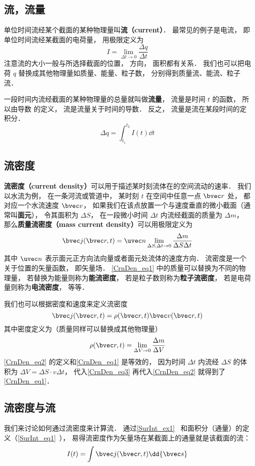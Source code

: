 

\subsection{流，流量}
单位时间流经某个截面的某种物理量叫\textbf{流（current）}． 最常见的例子是电流， 即单位时间流经某截面的电荷量， 用极限定义为
\begin{equation}
I = \lim_{\Delta t \to 0} \frac{\Delta q}{\Delta t}
\end{equation}
注意流的大小一般与所选择截面的位置， 方向， 面积都有关系． 我们也可以把电荷 $q$ 替换成其他物理量如质量、能量、粒子数， 分别得到质量流、能流、粒子流．

一段时间内流经截面的某种物理量的总量就叫做\textbf{流量}， 流量是时间 $t$ 的函数， 所以由导数 的定义， 流是流量关于时间的导数． 反之， 流量是流在某段时间的定积分．
\begin{equation}
\Delta q = \int_{t_1}^{t_2} I(t) \dd{t}
\end{equation}

\subsection{流密度}
\textbf{流密度（current density）}可以用于描述某时刻流体在的空间流动的速率． 我们以水流为例， 在一条河流或管道中， 某时刻 $t$ 在空间中任意一点 $\bvec r$ 处， 都对应一个水流速度 $\bvec v$， 如果我们在该点放置一个与速度垂直的微小截面（通常叫\textbf{面元}）， 令其面积为 $\Delta S$， 在一段微小时间 $\Delta t$ 内流经截面的质量为 $\Delta m$， 那么\textbf{质量流密度（mass current density）}可以用极限定义为
\begin{equation}\label{CrnDen_eq1}
\bvec j(\bvec r, t) = \uvec n \lim_{\Delta S, \Delta t \to 0} \frac{\Delta m}{\Delta S \Delta t}
\end{equation}
其中 $\uvec n$ 表示面元正方向法向量或者面元处流体的速度方向． 流密度是一个关于位置的矢量函数， 即矢量场． \autoref{CrnDen_eq1} 中的质量可以替换为不同的物理量， 若替换为能量则称为\textbf{能流密度}， 若是粒子数则称为\textbf{粒子流密度}， 若是电荷量则称为\textbf{电流密度}， 等等． 

我们也可以根据密度和速度来定义流密度
\begin{equation}\label{CrnDen_eq2}
\bvec j(\bvec r, t) = \rho(\bvec r, t) \bvec v(\bvec r, t)
\end{equation}
其中密度定义为（质量同样可以替换成其他物理量）
\begin{equation}\label{CrnDen_eq3}
\rho(\bvec r, t) = \lim_{\Delta V\to 0} \frac{\Delta m}{\Delta V}
\end{equation}
\autoref{CrnDen_eq2} 的定义和\autoref{CrnDen_eq1} 是等效的， 因为时间 $\Delta t$ 内流经 $\Delta S$ 的体积为 $\Delta V = \Delta S \cdot v  \Delta t$， 代入\autoref{CrnDen_eq3} 再代入\autoref{CrnDen_eq2} 就得到了\autoref{CrnDen_eq1}．

\subsection{流密度与流}
我们来讨论如何通过流密度来计算流． 通过\autoref{SurInt_ex1}~ 和面积分（通量）的定义（\autoref{SurInt_eq1}~）， 易得流密度作为矢量场在某截面上的通量就是该截面的流：
\begin{equation}
I(t) = \int \bvec j(\bvec r, t) \dd{\bvec s}
\end{equation}
